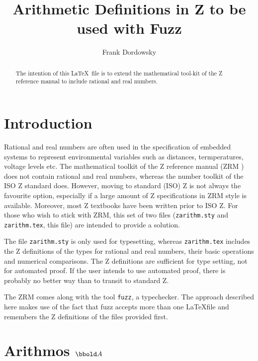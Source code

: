 \documentclass[12pt]{article}
\begin{document}
\title{Arithmetic Definitions in  Z to be used with Fuzz}

\author{Frank Dordowsky}

\maketitle

\begin{abstract}
The intention of this \LaTeX\ file is to extend the mathematical
tool-kit of the Z reference manual to include rational and real
numbers. 
\end{abstract}


\section{Introduction}
\label{sec:intro}
Rational and real numbers are often used in the specification of
embedded systems to represent environmental variables such as
distances, termperatures, voltage levels etc. The mathematical toolkit
of the Z reference manual (ZRM \cite{Spivey1998}) does not contain
rational and real numbers, whereas the number toolkit of the ISO Z
standard does. However, moving to standard (ISO) Z \cite{ISO13568} is
not always the favourite option, especially if a large amount of Z
specifications in ZRM style is available. Moreover, most Z textbooks
have been written prior to ISO Z. For those who wish to stick with
ZRM, this set of two files (\texttt{zarithm.sty} and
\texttt{zarithm.tex}, this file) are intended to provide a solution.

The file \texttt{zarithm.sty} is only used for typesetting, whereas
\texttt{zarithm.tex} includes the Z definitions of the types for
rational and real numbers, their basic operations and numerical
comparisons. The Z definitions are sufficient for type setting, not
for automated proof. If the user intends to use automated proof, there
is probably no better way than to transit to standard Z.

The ZRM comes along with the tool \texttt{fuzz}, a typechecker. The
approach described here makes use of the fact that fuzz accepts more
than one \LaTeX file and remembers the Z definitions of the files
provided first.

\section{Arithmos $\arithmos$}
\label{sec:arithmos}
\end{document}
